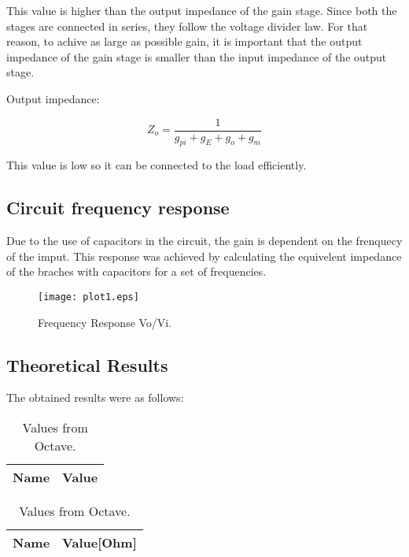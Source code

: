 This value is higher than the output impedance of the gain stage. Since both the stages are connected in series, they follow the voltage divider law. For that reason, to achive as large as possible gain, it is important that the output impedance of the gain stage is smaller than the input impedance of the output stage.

Output impedance:

\[
Z_o = \frac{1}{g_{pi}+g_E+g_o+g_m}
\]

This value is low so it can be connected to the load efficiently.

\subsection {Circuit frequency response}
Due to the use of capacitors in the circuit, the gain is dependent on the frenquecy of the imput. This response was achieved by calculating the equivelent impedance of the braches with capacitors for a set of frequencies.

\begin{figure}[ht]
	\centering
	\texttt{[image: plot1.eps]}
	\caption{Frequency Response Vo/Vi.}
\label{fig:oct}
\end{figure}


\subsection{Theoretical Results}
\label{subsec:res_the}

The obtained results were as follows:

\begin{table}[ht]
	\centering
	\begin{tabular}{|l|r|}
		\hline    
		{\bf Name} & {\bf Value} \\ \hline
    		
	\end{tabular}
	
	\caption{Values from Octave.}
    
\label{tab:op_teo}
\end{table}

\begin{table}[ht]
	\centering
	\begin{tabular}{|l|r|}
		\hline    
		{\bf Name} & {\bf Value[Ohm]} \\ \hline
    		
	\end{tabular}
	
	\caption{Values from Octave.}
    
\label{tab:imp_teo}
\end{table}
